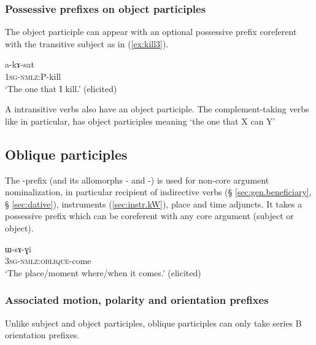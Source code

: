 \subsubsection{Possessive prefixes on object participles}  \label{ex:object.participle.possessive} 
 
The object participle can appear with an optional possessive prefix coreferent with the transitive subject as in (\ref{ex:kill3}).
  
  \begin{exe}
\ex \label{ex:kill3}
\gll a-kɤ-sat    \\
   \textsc{1sg-nmlz}:P-kill \\
 \glt  `The one that I kill.' (elicited)
 \end{exe}


A intransitive verbs also have an object participle. The complement-taking verbs like  in particular, has object participles meaning `the one that X can Y'

\subsection{Oblique participles}
The -prefix (and its allomorphs - and -) is used for non-core argument nominalization, in particular recipient of indirective verbs (§ \ref{sec:gen.beneficiary}, § \ref{sec:dative}), instruments (\ref{sec:instr.kW}), place and time adjuncts. It takes a possessive prefix which can be coreferent with any core argument (subject or object).

   \begin{exe}
\ex \label{ex:come}
\gll ɯ-sɤ-ɣi    \\
   \textsc{3sg-nmlz:oblique}-come \\
 \glt  `The place/moment where/when it comes.' (elicited)
 \end{exe}
 
 
\subsubsection{Associated motion, polarity and orientation prefixes} \label{sec:onlique.participle.orientation}
Unlike subject and object participles, oblique participles can only take series B orientation prefixes. 


